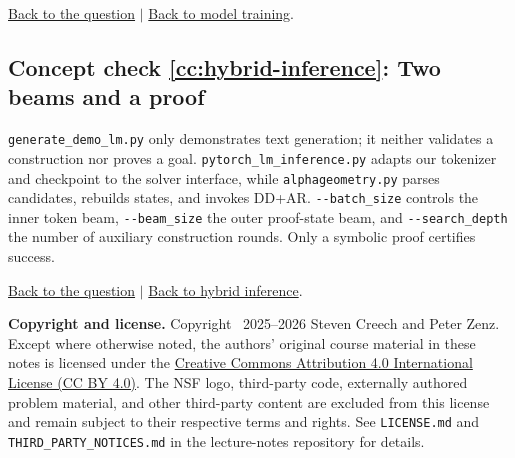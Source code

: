 \documentclass[reqno]{amsart}
\DeclareMathOperator{\1}{\textbf{1}}
\begin{document}
\noindent\hyperlink{ccq:model-training}{Back to the question}
$\mid$
\hyperref[sec:model-training]{Back to model training}.

\hypertarget{cca:hybrid-inference}{}
\subsection*{Concept check \ref{cc:hybrid-inference}: Two beams and a proof}

\verb|generate_demo_lm.py| only demonstrates text generation; it neither
validates a construction nor proves a goal. \verb|pytorch_lm_inference.py|
adapts our tokenizer and checkpoint to the solver interface, while
\verb|alphageometry.py| parses candidates, rebuilds states, and invokes DD+AR.
\verb|--batch_size| controls the inner token beam, \verb|--beam_size| the
outer proof-state beam, and \verb|--search_depth| the number of auxiliary
construction rounds. Only a symbolic proof certifies success.

\noindent\hyperlink{ccq:hybrid-inference}{Back to the question}
$\mid$
\hyperref[sec:hybrid-inference]{Back to hybrid inference}.

\endgroup




\par\bigskip
{\footnotesize
\noindent\textbf{Copyright and license.}
Copyright \textcopyright\ 2025--2026 Steven Creech and Peter Zenz. Except
where otherwise noted, the authors' original course material in these notes is
licensed under the
\href{https://creativecommons.org/licenses/by/4.0/}{Creative Commons
Attribution 4.0 International License (CC BY 4.0)}. The NSF logo, third-party
code, externally authored problem material, and other third-party content are
excluded from this license and remain subject to their respective terms and
rights. See \texttt{LICENSE.md} and \texttt{THIRD\_PARTY\_NOTICES.md} in the
lecture-notes repository for details.
\par}
\end{document}
